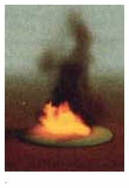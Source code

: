 \begin{figure}[htb!]
        \centering
        \begin{subfigure}[t]{0.2\textwidth}
                \includegraphics[width=\textwidth]{img/stam_1995}
                \caption{\cite{Stam:1995}.}
        \end{subfigure}%
        \quad %
        \begin{subfigure}[t]{0.22\textwidth}

\end{subfigure}
\end{figure}
